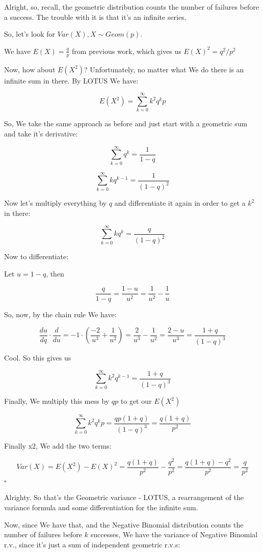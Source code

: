 \documentclass{article}
\newcommand{\qed}{\hfill$\square$}
\begin{document}
		Alright, so, recall, the geometric distribution counts the number of failures before a success. The trouble with it is that it's an infinite series.
		
		So, let's look for $Var(X), X\sim Geom(p)$. 
		
		We have $E(X) = \frac{q}{p}$ from previous work, which gives us $E(X)^2 = q^2/p^2$
		
		Now, how about $E(X^2)$? Unfortunately, no matter what We do there is an infinite sum in there. By LOTUS We have:
		
		$$E(X^2) = \sum^\infty_{k=0} k^2q^kp$$
		
		So, We take the same approach as before and just start with a geometric sum and take it's derivative:
		
		$$\sum^\infty_{k = 0} q^k = \frac{1}{1 - q}$$
		
		$$\sum^\infty_{k = 0} kq^{k-1} = \frac{1}{(1-q)^2}$$
		
		Now let's multiply everything by $q$ and differentiate it again in order to get a $k^2$ in there:
		
		$$\sum^\infty_{k=0} kq^{k} = \frac{q}{(1-q)^2}$$
		
		Now to differentiate:
		
		Let $u = 1-q$, then
		
		$$\frac{q}{1-q} = \frac{1-u}{u^2} = \frac{1}{u^2} - \frac{1}{u}$$
		
		So, now, by the chain rule We have:
		
		$$\frac{du}{dq} \cdot \frac{d}{du} = -1 \cdot \left( \frac{-2}{u^3} + \frac{1}{u^2}\right) = \frac{2}{u^3} - \frac{1}{u^2} = \frac{2-u}{u^3} = \frac{1+q}{(1-q)^3}$$
		
		Cool. So this gives us
		
		$$\sum^\infty_{k=0} k^2q^{k-1} = \frac{1+q}{(1-q)^3}$$
		
		Finally, We multiply this mess by $qp$ to get our $E(X^2)$
		
		$$\sum^\infty_{k=0} k^2q^{k}p = \frac{qp(1+q)}{(1-q)^3} = \frac{q(1+q)}{p^2}$$
		
		Finally x2, We add the two terms:
		
		$$Var(X) = E(X^2) - E(X)^2 = \frac{q(1+q)}{p^2} - \frac{q^2}{p^2} = \frac{q(1+q)-q^2}{p^2} = \frac{q}{p^2}$$\qed
		
		Alrighty. So that's the Geometric variance - LOTUS, a rearrangement of the variance formula and some differentiation for the infinite sum.
		
		Now, since We have that, and the Negative Binomial distribution counts the number of failures before $k$ successes, We have the variance of Negative Binomial r.v., since it's just a sum of independent geometric r.v.s:
		
\end{document}
